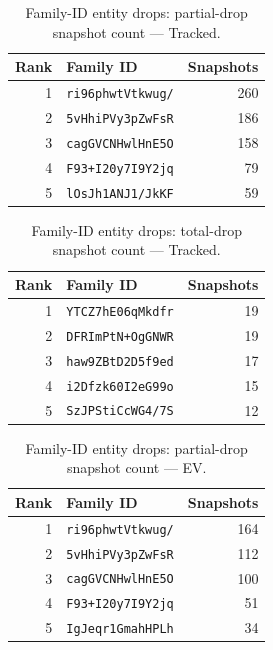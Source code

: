 \documentclass[conference]{IEEEtran}
\begin{document}
\begin{table}[H]
\caption{Family-ID entity drops: partial-drop snapshot count --- Tracked.}
\begin{center}\small
\begin{tabular}{|r|l|r|}
\hline
\textbf{Rank} & \textbf{Family ID} & \textbf{Snapshots} \\ \hline
1 & \texttt{ri96phwtVtkwug/} & 260 \\ \hline
2 & \texttt{5vHhiPVy3pZwFsR} & 186 \\ \hline
3 & \texttt{cagGVCNHwlHnE5O} & 158 \\ \hline
4 & \texttt{F93+I20y7I9Y2jq} & 79 \\ \hline
5 & \texttt{lOsJh1ANJ1/JkKF} & 59 \\ \hline
\end{tabular}
\label{tab:famdrop_partial_tracked}
\end{center}\end{table}
 
\begin{table}[H]
\caption{Family-ID entity drops: total-drop snapshot count --- Tracked.}
\begin{center}\small
\begin{tabular}{|r|l|r|}
\hline
\textbf{Rank} & \textbf{Family ID} & \textbf{Snapshots} \\ \hline
1 & \texttt{YTCZ7hE06qMkdfr} & 19 \\ \hline
2 & \texttt{DFRImPtN+OgGNWR} & 19 \\ \hline
3 & \texttt{haw9ZBtD2D5f9ed} & 17 \\ \hline
4 & \texttt{i2Dfzk60I2eG99o} & 15 \\ \hline
5 & \texttt{SzJPStiCcWG4/7S} & 12 \\ \hline
\end{tabular}
\label{tab:famdrop_total_tracked}
\end{center}\end{table}
 
\begin{table}[H]
\caption{Family-ID entity drops: partial-drop snapshot count --- EV.}
\begin{center}\small
\begin{tabular}{|r|l|r|}
\hline
\textbf{Rank} & \textbf{Family ID} & \textbf{Snapshots} \\ \hline
1 & \texttt{ri96phwtVtkwug/} & 164 \\ \hline
2 & \texttt{5vHhiPVy3pZwFsR} & 112 \\ \hline
3 & \texttt{cagGVCNHwlHnE5O} & 100 \\ \hline
4 & \texttt{F93+I20y7I9Y2jq} & 51 \\ \hline
5 & \texttt{IgJeqr1GmahHPLh} & 34 \\ \hline
\end{tabular}
\label{tab:famdrop_partial_ephemeral_variable}
\end{center}\end{table}
 
\end{document}
